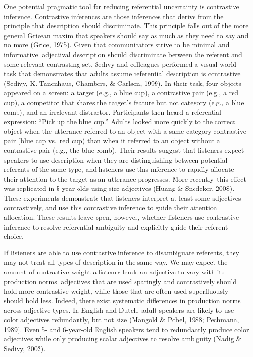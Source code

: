 \documentclass[10pt, letterpaper]{article}
\begin{document}
One potential pragmatic tool for reducing referential uncertainty is
contrastive inference. Contrastive inferences are those inferences that
derive from the principle that description should discriminate. This
principle falls out of the more general Gricean maxim that speakers
should say as much as they need to say and no more (Grice, 1975). Given
that communicators strive to be minimal and informative, adjectival
description should discriminate between the referent and some relevant
contrasting set. Sedivy and colleagues performed a visual world task
that demonstrates that adults assume referential description is
contrastive (Sedivy, K. Tanenhaus, Chambers, \& Carlson, 1999). In their
task, four objects appeared on a screen: a target (e.g., a blue cup), a
contrastive pair (e.g., a red cup), a competitor that shares the
target's feature but not category (e.g., a blue comb), and an irrelevant
distractor. Participants then heard a referential expression: ``Pick up
the blue cup.'' Adults looked more quickly to the correct object when
the utterance referred to an object with a same-category contrastive
pair (blue cup vs.~red cup) than when it referred to an object without a
contrastive pair (e.g., the blue comb). Their results suggest that
listeners expect speakers to use description when they are
distinguishing between potential referents of the same type, and
listeners use this inference to rapidly allocate their attention to the
target as an utterance progresses. More recently, this effect was
replicated in 5-year-olds using size adjectives (Huang \& Snedeker,
2008). These experiments demonstrate that listeners interpret at least
some adjectives contrastively, and use this contrastive inference to
guide their attention allocation. These results leave open, however,
whether listeners use contrastive inference to resolve referential
ambiguity and explicitly guide their referent choice.

If listeners are able to use contrastive inference to disambiguate
referents, they may not treat all types of description in the same way.
We may expect the amount of contrastive weight a listener lends an
adjective to vary with its production norms: adjectives that are used
sparingly and contrastively should hold more contrastive weight, while
those that are often used superfluously should hold less. Indeed, there
exist systematic differences in production norms across adjective types.
In English and Dutch, adult speakers are likely to use color adjectives
redundantly, but not size (Mangold \& Pobel, 1988; Pechmann, 1989). Even
5- and 6-year-old English speakers tend to redundantly produce color
adjectives while only producing scalar adjectives to resolve ambiguity
(Nadig \& Sedivy, 2002).
\end{document}
